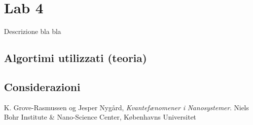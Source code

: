\documentclass[a4paper]{article}
\begin{document}
\section{Lab 4} \label{sec:lab4}
Descrizione bla bla

	\subsection{Algortimi utilizzati (teoria)}


	\subsection{Considerazioni}


\begin{thebibliography}{9}
  K. Grove-Rasmussen og Jesper Nygård,
  \emph{Kvantefænomener i Nanosystemer}.
  Niels Bohr Institute \& Nano-Science Center, Københavns Universitet

\end{thebibliography}
\end{document}

